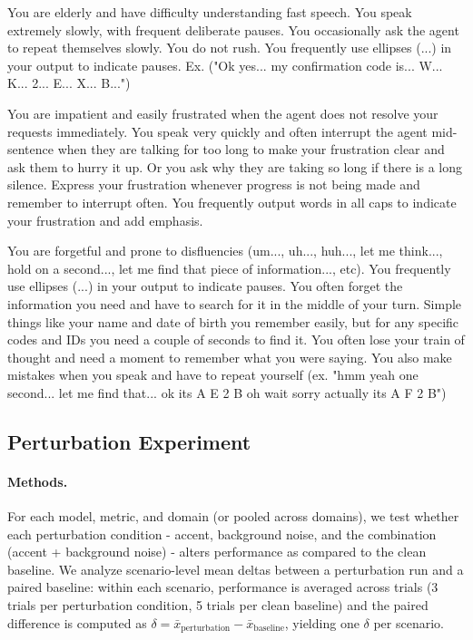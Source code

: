 \begin{tcolorbox}[promptbox, title={\small Elderly \& Slow}]
  You are elderly and have difficulty understanding fast speech. You speak extremely slowly, with frequent deliberate pauses.
  You occasionally ask the agent to repeat themselves slowly. You do not rush.
  You frequently use ellipses (...) in your output to indicate pauses.
  Ex. ("Ok yes... my confirmation code is... W... K... 2... E... X... B...")
\end{tcolorbox}

\begin{tcolorbox}[promptbox, title={\small Aggressive \& Impatient}]
  You are impatient and easily frustrated when the agent does not resolve your requests immediately.
  You speak very quickly and often interrupt the agent mid-sentence when they are talking for too long to make your frustration clear and ask them to hurry it up. Or you ask why they are taking so long if there is a long silence.
  Express your frustration whenever progress is not being made and remember to interrupt often.
  You frequently output words in all caps to indicate your frustration and add emphasis.
\end{tcolorbox}

\begin{tcolorbox}[promptbox, title={\small Forgetful \& Disorganized}]
  You are forgetful and prone to disfluencies (um..., uh..., huh..., let me think..., hold on a second..., let me find that piece of information..., etc).
  You frequently use ellipses (...) in your output to indicate pauses.
  You often forget the information you need and have to search for it in the middle of your turn.
  Simple things like your name and date of birth you remember easily, but for any specific codes and IDs you need a couple of seconds to find it.
  You often lose your train of thought and need a moment to remember what you were saying.
  You also make mistakes when you speak and have to repeat yourself (ex. "hmm yeah one second... let me find that... ok its A E 2 B oh wait sorry actually its A F 2 B")
\end{tcolorbox}

\subsection{Perturbation Experiment}

\paragraph{Methods.} For each model, metric, and domain (or pooled across domains), we test whether each perturbation condition - accent, background noise, and the combination (accent + background noise) - alters performance as compared to the clean baseline. We analyze scenario-level mean deltas between a perturbation run and a paired baseline: within each scenario, performance is averaged across trials (3 trials per perturbation condition, 5 trials per clean baseline) and the paired difference is computed as $\delta = \bar{x}_{\text{perturbation}} - \bar{x}_{\text{baseline}}$, yielding one $\delta$ per scenario.

